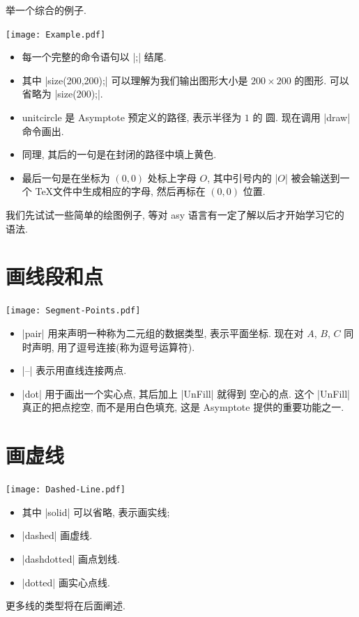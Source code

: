 \documentclass[nofonts,CJKnormalspaces]{ctexbook}[2009/05/20]
\begin{document}
举一个综合的例子.
\begin{center}\texttt{[image: Example.pdf]}\end{center}%

\begin{itemize}
\item 每一个完整的命令语句以 |;| 结尾.
\item 其中 |size(200,200);| 可以理解为我们输出图形大小是 $200\times 200$
  的图形. 可以省略为 |size(200);|.
\item {unitcircle} 是 Asymptote 预定义的路径, 表示半径为 $1$ 的
  圆. 现在调用 |draw| 命令画出.
\item 同理, 其后的一句是在封闭的路径中填上黄色.
\item 最后一句是在坐标为 $(0,0)$ 处标上字母 $O$, 其中引号内的 |$O$|
  被会输送到一个 \TeX 文件中生成相应的字母, 然后再标在 $(0,0)$ 位置.
\end{itemize}

我们先试试一些简单的绘图例子, 等对 asy 语言有一定了解以后才开始学习它的
语法.

\section{画线段和点}
\begin{center}\texttt{[image: Segment-Points.pdf]}\end{center}%

\begin{itemize}
\item |pair| 用来声明一种称为二元组的数据类型, 表示平面坐标. 现在对 $A$,
  $B$, $C$ 同时声明, 用了逗号连接(称为逗号运算符).
\item |--| 表示用直线连接两点.
\item |dot| 用于画出一个实心点, 其后加上 |UnFill| 就得到
  空心的点. 这个 |UnFill| 真正的把点挖空, 而不是用白色填充, 这是
  Asymptote 提供的重要功能之一.
\end{itemize}

\section{画虚线}
\begin{center}\texttt{[image: Dashed-Line.pdf]}\end{center}%

\begin{itemize}
\item  其中 |solid| 可以省略, 表示画实线;
\item |dashed| 画虚线.
\item |dashdotted| 画点划线.
\item |dotted| 画实心点线.
\end{itemize}
更多线的类型将在后面阐述.
\end{document}

